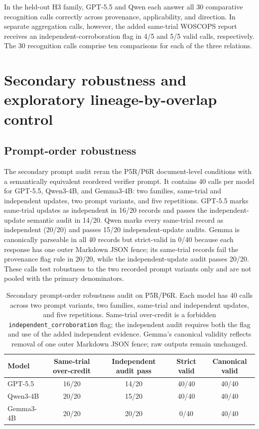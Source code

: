 \documentclass[11pt]{article}
\begin{document}
In the held-out H3 family, GPT-5.5 and Qwen each answer all 30 comparative recognition calls correctly across provenance, applicability, and direction. In separate aggregation calls, however, the added same-trial WOSCOPS report receives an independent-corroboration flag in 4/5 and 5/5 valid calls, respectively. The 30 recognition calls comprise ten comparisons for each of the three relations.

\section{Secondary robustness and exploratory lineage-by-overlap control}
\label{app:secondary-analyses}

\subsection{Prompt-order robustness}

The secondary prompt audit reran the P5R/P6R document-level conditions with a semantically equivalent reordered verifier prompt. It contains 40 calls per model for GPT-5.5, Qwen3-4B, and Gemma3-4B: two families, same-trial and independent updates, two prompt variants, and five repetitions. GPT-5.5 marks same-trial updates as independent in 16/20 records and passes the independent-update semantic audit in 14/20. Qwen marks every same-trial record as independent (20/20) and passes 15/20 independent-update audits. Gemma is canonically parseable in all 40 records but strict-valid in 0/40 because each response has one outer Markdown JSON fence; its same-trial records fail the provenance flag rule in 20/20, while the independent-update audit passes 20/20. These calls test robustness to the two recorded prompt variants only and are not pooled with the primary denominators.

\begin{table}[t]
\centering
\small
\begin{tabular}{@{}lcccc@{}}
\toprule
Model & Same-trial over-credit & Independent audit pass & Strict valid & Canonical valid \\
\midrule
GPT-5.5 & 16/20 & 14/20 & 40/40 & 40/40 \\
Qwen3-4B & 20/20 & 15/20 & 40/40 & 40/40 \\
Gemma3-4B & 20/20 & 20/20 & 0/40 & 40/40 \\
\bottomrule
\end{tabular}
\caption{Secondary prompt-order robustness audit on P5R/P6R. Each model has 40 calls across two prompt variants, two families, same-trial and independent updates, and five repetitions. Same-trial over-credit is a forbidden \texttt{independent\_corroboration} flag; the independent audit requires both the flag and use of the added independent evidence. Gemma's canonical validity reflects removal of one outer Markdown JSON fence; raw outputs remain unchanged.}
\label{tab:prompt-robustness}
\end{table}
\end{document}
